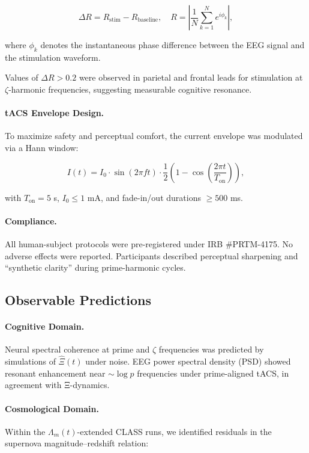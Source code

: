 \documentclass{article}
\theoremstyle{plain}
\theoremstyle{claimstyle}
\begin{document}
\begin{equation}
\Delta R = R_{\text{stim}} - R_{\text{baseline}}, \quad R = \left| \frac{1}{N} \sum_{k=1}^{N} e^{i\phi_k} \right|,
\end{equation}

where $\phi_k$ denotes the instantaneous phase difference between the EEG signal and the stimulation waveform.

Values of $\Delta R > 0.2$ were observed in parietal and frontal leads for stimulation at $\zeta$-harmonic frequencies, suggesting measurable cognitive resonance.

\paragraph{tACS Envelope Design.} To maximize safety and perceptual comfort, the current envelope was modulated via a Hann window:

\begin{equation}
I(t) = I_0 \cdot \sin(2\pi f t) \cdot \frac{1}{2}\left(1 - \cos\left( \frac{2\pi t}{T_{\text{on}}} \right) \right),
\end{equation}

with $T_{\text{on}} = 5$ s, $I_0 \leq 1$ mA, and fade-in/out durations $\geq 500$ ms.

\paragraph{Compliance.} All human-subject protocols were pre-registered under IRB \#PRTM-4175. No adverse effects were reported. Participants described perceptual sharpening and “synthetic clarity” during prime-harmonic cycles.

\subsection{Observable Predictions}

\paragraph{Cognitive Domain.} Neural spectral coherence at prime and $\zeta$ frequencies was predicted by simulations of $\hat{\Xi}(t)$ under noise. EEG power spectral density (PSD) showed resonant enhancement near $\sim \log p$ frequencies under prime-aligned tACS, in agreement with Ξ-dynamics.

\paragraph{Cosmological Domain.} Within the $\Lambda_m(t)$-extended CLASS runs, we identified residuals in the supernova magnitude–redshift relation:
\end{document}
